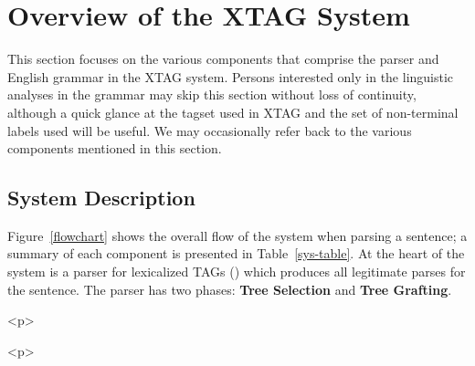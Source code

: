 \chapter{Overview of the XTAG System} 
\label{overview} 
 
This section focuses on the various components that comprise the 
parser and English grammar in the XTAG system.  Persons interested 
only in the linguistic analyses in the grammar may skip this section 
without loss of continuity, although a quick glance at the tagset used 
in XTAG and the set of non-terminal labels used will be useful. We may 
occasionally refer back to the various components mentioned in this 
section. 
 
\section{System Description} 
 
Figure~{\ref{flowchart}} shows the overall flow of the system when 
parsing a sentence; a summary of each component is presented in 
Table~\ref{sys-table}. At the heart of the system is a parser for 
lexicalized TAGs (\cite{schabesjoshi88,schabes90}) which produces all 
legitimate parses for the sentence. The parser has two phases: {\bf Tree Selection} and {\bf Tree Grafting}. 
 
\begin{rawhtml} <p> \end{rawhtml}
\hspace{0.35in} 
\centering 
{} 
\begin{rawhtml} <dl> <dt>[XTAG system diagram]{Overview of XTAG system  <p> </dl> \end{rawhtml}
\label{flowchart} 
\begin{rawhtml} <p> \end{rawhtml}
 
